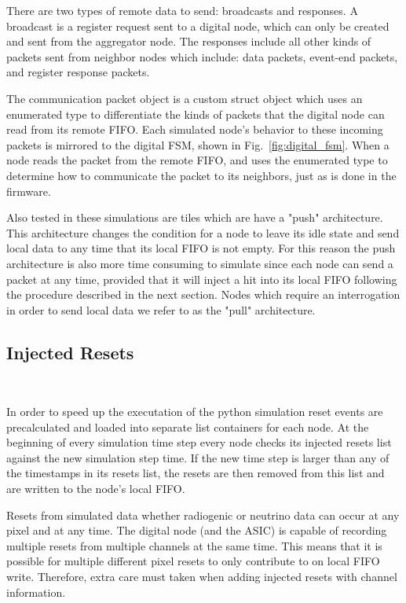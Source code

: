 There are two types of remote data to send: broadcasts and responses.
A broadcast is a register request sent to a digital node, which can only be created and sent from the aggregator node.
The responses include all other kinds of packets sent from neighbor nodes which include: data packets, event-end packets, and register response packets.

The communication packet object is a custom struct object which uses an enumerated type to differentiate the kinds of packets that the digital node can read from its remote FIFO.
Each simulated node's behavior to these incoming packets is mirrored to the digital FSM, shown in Fig.~\ref{fig:digital_fsm}.
When a node reads the packet from the remote FIFO, and uses the enumerated type to determine how to communicate the packet to its neighbors, just as is done in the firmware.

Also tested in these simulations are tiles which are have a "push" architecture.
This architecture changes the condition for a node to leave its idle state and send local data to any time that its local FIFO is not empty.
For this reason the push architecture is also more time consuming to simulate since each node can send a packet at any time, provided that it will inject a hit into its local FIFO following the procedure described in the next section.
Nodes which require an interrogation in order to send local data we refer to as the "pull" architecture.

\subsection{Injected Resets}~\label{sec:hits}

In order to speed up the executation of the python simulation reset events are precalculated and loaded into separate list containers for each node.
At the beginning of every simulation time step every node checks its injected resets list against the new simulation step time.
If the new time step is larger than any of the timestamps in its resets list, the resets are then removed from this list and are written to the node's local FIFO.

Resets from simulated data whether radiogenic or neutrino data can occur at any pixel and at any time.
The digital node (and the ASIC) is capable of recording multiple resets from multiple channels at the same time.
This means that it is possible for multiple different pixel resets to only contribute to on local FIFO write.
Therefore, extra care must taken when adding injected resets with channel information.

